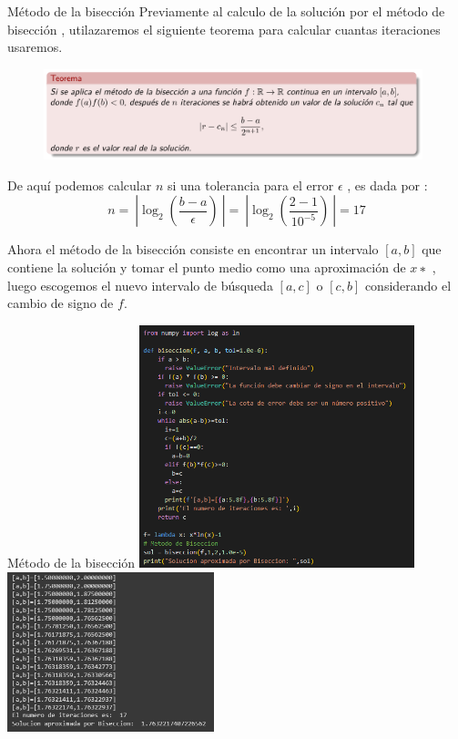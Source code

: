 \begin{frame}{Método de la bisección}
Previamente al calculo de la solución por el método de bisección , utilazaremos el siguiente teorema para calcular cuantas iteraciones usaremos.
        \begin{figure}
			\includegraphics[width=11cm]{p10-teorema2.png}
		\end{figure}
De aquí podemos calcular \(n\) si una tolerancia para el error \( \epsilon \) , es dada por :
\begin{equation*}
    n = \ | \log_2 (\frac{b-a}{\epsilon}) \ | = \ | \log_2 (\frac{2-1}{10^{-5}}) \ | = 17
\end{equation*}

Ahora el método de la bisección consiste en encontrar un intervalo \( [a, b] \) que contiene la solución y
tomar el punto medio como una aproximación de \( x∗ \) , luego escogemos el nuevo intervalo de
búsqueda \( [a, c] \) o \( [c, b] \) considerando el cambio de signo de \( f \).
\end{frame}

\begin{frame}{Método de la bisección}
         \includegraphics[width=8cm]{p10-codigo-biseccion.png}
        \includegraphics[width=6cm]{p10-ejecucion-biseccion.png}
\end{frame}

